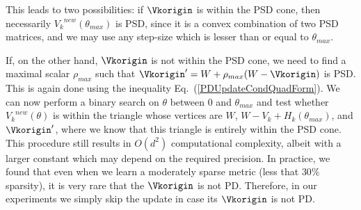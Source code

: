 \documentclass[twoside,11pt]{article}
\newcommand\mat[1]{{#1}}
\renewcommand\vec[1]{\mathbf{#1}}
\newcommand{\W}{\mat{W}}
\newcommand{\newW}{{\mat{W^{new}}}}
\newcommand{\Hk}{H_k}
\newcommand{\Vk}{\mat{V_k}}
\renewcommand{\eqref}[1]{Eq.~(\ref{#1})}
\begin{document}
This leads to two possibilities: if $\Vkorigin$ is within the PSD cone, then necessarily $\Vk^{new} (\theta_{max})$ is PSD, since it is a convex combination of two PSD matrices, and we may use any step-size which is lesser than or equal to $\theta_{max}$.

If, on the other hand, $\Vkorigin$ is not within the PSD cone, we need to find a maximal scalar $\rho_{max}$ such that $\Vkorigin' = W + \rho_{max}(W-\Vkorigin)$ is PSD. This is again done using the inequality \eqref{PDUpdateCondQuadForm}. We can now perform a binary search on $\theta$ between $0$ and $\theta_{max}$ and test whether $\Vk^{new}(\theta)$ is within the triangle whose vertices are $W$, $W-\Vk + \Hk(\theta_{max})$, and $\Vkorigin'$, where we know that this triangle is entirely within the PSD cone. This procedure still results in $O(d^2)$ computational complexity, albeit with a larger constant which may depend on the required precision. In practice, we found that even when we learn a moderately sparse metric (less that $30\%$ sparsity), it is very rare that the $\Vkorigin$ is not PD. Therefore, in our experiments we simply skip the update in case its $\Vkorigin$ is not PD.


\end{document}
